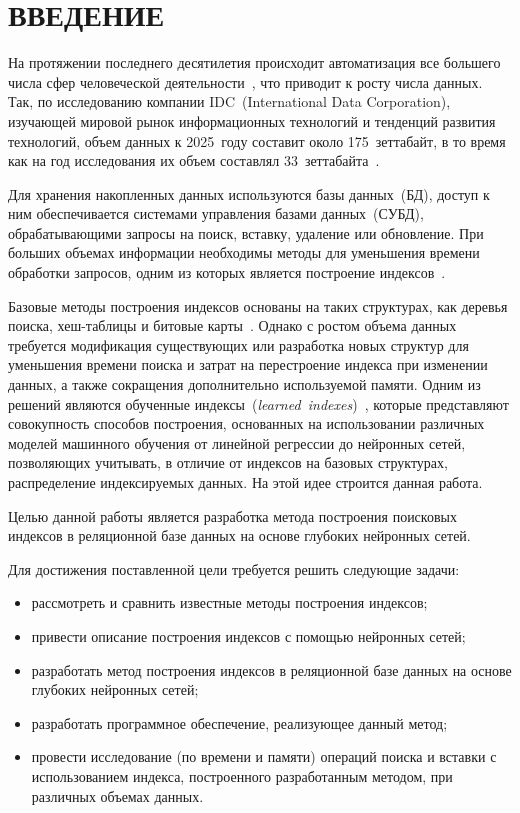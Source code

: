\chapter*{ВВЕДЕНИЕ}

На протяжении последнего десятилетия происходит автоматизация все большего числа
сфер человеческой деятельности~\cite{koptenok}, что приводит к росту числа
данных. Так, по исследованию компании IDC~(International Data Corporation),
изучающей мировой рынок информационных технологий и тенденций развития
технологий, объем данных к 2025~году составит около 175~зеттабайт, в то время
как на год исследования их объем составлял 33~зеттабайта~\cite{idc}.

Для хранения накопленных данных используются базы данных~(БД), доступ к ним
обеспечивается системами управления базами данных~(СУБД), обрабатывающими
запросы на поиск, вставку, удаление или обновление. При больших объемах
информации необходимы методы для уменьшения времени обработки запросов, одним из
которых является построение индексов~\cite{bits}.

Базовые методы построения индексов основаны на таких структурах, как деревья
поиска, хеш-таблицы и битовые карты~\cite{dama}. Однако с ростом объема данных
требуется модификация существующих или разработка новых структур для уменьшения
времени поиска и затрат на перестроение индекса при изменении данных, а также
сокращения дополнительно используемой памяти. Одним из решений являются
обученные индексы~(\textit{learned~indexes})~\cite{main}, которые представляют
совокупность способов построения, основанных на использовании различных моделей
машинного обучения от линейной регрессии до нейронных сетей, позволяющих
учитывать, в отличие от индексов на базовых структурах, распределение
индексируемых данных. На этой идее строится данная работа.

Целью данной работы является разработка метода построения поисковых индексов в
реляционной базе данных на основе глубоких нейронных сетей.

Для достижения поставленной цели требуется решить следующие задачи:
\begin{itemize}
    \item рассмотреть и сравнить известные методы построения индексов;
    \item привести описание построения индексов с помощью нейронных сетей;
    \item разработать метод построения индексов в реляционной базе
        данных на основе глубоких нейронных сетей;
    \item разработать программное обеспечение, реализующее данный метод;
    \item провести исследование (по времени и памяти) операций поиска и вставки
        с использованием индекса, построенного разработанным методом, при
        различных объемах данных.
\end{itemize}

